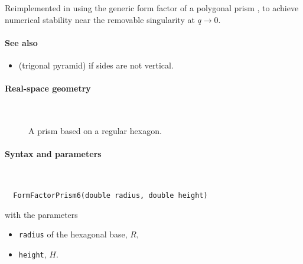 Reimplemented in  using the generic form factor
of a polygonal prism \cite{Wut17},
to achieve numerical stability near the removable singularity at $q\to0$.

\paragraph{See also}
\begin{itemize}
\item {} (trigonal pyramid) if sides are not vertical.
\end{itemize}


 \label{SPrism6}

\paragraph{Real-space geometry}\strut\\

\begin{figure}[H]
\hfill
{}
\hfill
{}
\hfill
{}
\hfill
\caption{A prism based on a regular hexagon.}
\end{figure}

\FloatBarrier

\paragraph{Syntax and parameters}\strut\\[-2ex plus .2ex minus .2ex]
\begin{lstlisting}
  FormFactorPrism6(double radius, double height)
\end{lstlisting}
with the parameters
\begin{itemize}
\item \texttt{radius} of the hexagonal base, $R$,
\item \texttt{height}, $H$.
\end{itemize}

